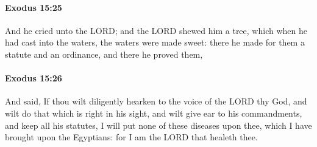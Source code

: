 		\paragraph{Exodus 15:25} %
			\label{EXODUS-15-25}

			And he cried unto the LORD; and the LORD shewed him a tree, which when he had cast into the waters, the waters were made sweet: there he made for them a statute and an ordinance, and there he proved them,


		\paragraph{Exodus 15:26} %
			\label{EXODUS-15-26}

			And said, If thou wilt diligently hearken to the voice of the LORD thy God, and wilt do that which is right in his sight, and wilt give ear to his commandments, and keep all his statutes, I will put none of these diseases upon thee, which I have brought upon the Egyptians: for I am the LORD that healeth thee.

